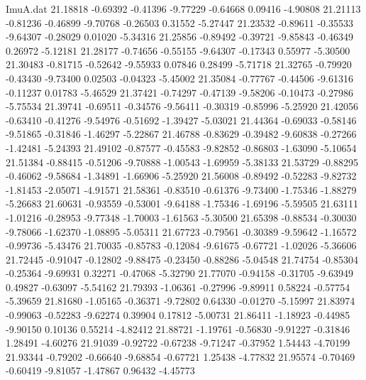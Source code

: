 \begin{filecontents}{ImuA.dat}
  21.18818   -0.69392   -0.41396   -9.77229   -0.64668    0.09416   -4.90808
  21.21113   -0.81236   -0.46899   -9.70768   -0.26503    0.31552   -5.27447
  21.23532   -0.89611   -0.35533   -9.64307   -0.28029    0.01020   -5.34316
  21.25856   -0.89492   -0.39721   -9.85843   -0.46349    0.26972   -5.12181
  21.28177   -0.74656   -0.55155   -9.64307   -0.17343    0.55977   -5.30500
  21.30483   -0.81715   -0.52642   -9.55933    0.07846    0.28499   -5.71718
  21.32765   -0.79920   -0.43430   -9.73400    0.02503   -0.04323   -5.45002
  21.35084   -0.77767   -0.44506   -9.61316   -0.11237    0.01783   -5.46529
  21.37421   -0.74297   -0.47139   -9.58206   -0.10473   -0.27986   -5.75534
  21.39741   -0.69511   -0.34576   -9.56411   -0.30319   -0.85996   -5.25920
  21.42056   -0.63410   -0.41276   -9.54976   -0.51692   -1.39427   -5.03021
  21.44364   -0.69033   -0.58146   -9.51865   -0.31846   -1.46297   -5.22867
  21.46788   -0.83629   -0.39482   -9.60838   -0.27266   -1.42481   -5.24393
  21.49102   -0.87577   -0.45583   -9.82852   -0.86803   -1.63090   -5.10654
  21.51384   -0.88415   -0.51206   -9.70888   -1.00543   -1.69959   -5.38133
  21.53729   -0.88295   -0.46062   -9.58684   -1.34891   -1.66906   -5.25920
  21.56008   -0.89492   -0.52283   -9.82732   -1.81453   -2.05071   -4.91571
  21.58361   -0.83510   -0.61376   -9.73400   -1.75346   -1.88279   -5.26683
  21.60631   -0.93559   -0.53001   -9.64188   -1.75346   -1.69196   -5.59505
  21.63111   -1.01216   -0.28953   -9.77348   -1.70003   -1.61563   -5.30500
  21.65398   -0.88534   -0.30030   -9.78066   -1.62370   -1.08895   -5.05311
  21.67723   -0.79561   -0.30389   -9.59642   -1.16572   -0.99736   -5.43476
  21.70035   -0.85783   -0.12084   -9.61675   -0.67721   -1.02026   -5.36606
  21.72445   -0.91047   -0.12802   -9.88475   -0.23450   -0.88286   -5.04548
  21.74754   -0.85304   -0.25364   -9.69931    0.32271   -0.47068   -5.32790
  21.77070   -0.94158   -0.31705   -9.63949    0.49827   -0.63097   -5.54162
  21.79393   -1.06361   -0.27996   -9.89911    0.58224   -0.57754   -5.39659
  21.81680   -1.05165   -0.36371   -9.72802    0.64330   -0.01270   -5.15997
  21.83974   -0.99063   -0.52283   -9.62274    0.39904    0.17812   -5.00731
  21.86411   -1.18923   -0.44985   -9.90150    0.10136    0.55214   -4.82412
  21.88721   -1.19761   -0.56830   -9.91227   -0.31846    1.28491   -4.60276
  21.91039   -0.92722   -0.67238   -9.71247   -0.37952    1.54443   -4.70199
  21.93344   -0.79202   -0.66640   -9.68854   -0.67721    1.25438   -4.77832
  21.95574   -0.70469   -0.60419   -9.81057   -1.47867    0.96432   -4.45773

\end{filecontents}
